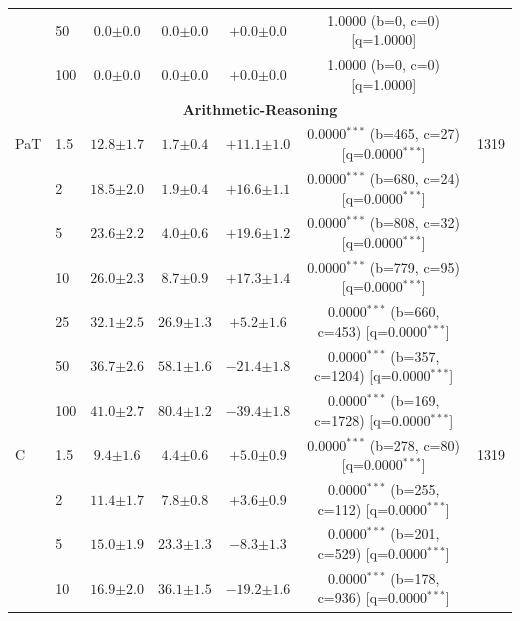 \begin{table}[h!]
\begin{tabular}{l l cccc c}
 & 50 & $0.0 {\scriptstyle \pm 0.0}$ & $0.0 {\scriptstyle \pm 0.0}$ & $+0.0 {\scriptstyle \pm 0.0}$ & 1.0000 (b=0, c=0) [q=1.0000] &  \\
 & 100 & $0.0 {\scriptstyle \pm 0.0}$ & $0.0 {\scriptstyle \pm 0.0}$ & $+0.0 {\scriptstyle \pm 0.0}$ & 1.0000 (b=0, c=0) [q=1.0000] &  \\
\midrule
\multicolumn{7}{c}{\textbf{Arithmetic-Reasoning}} \\
\midrule
PaT & 1.5 & $12.8 {\scriptstyle \pm 1.7}$ & $1.7 {\scriptstyle \pm 0.4}$ & $+11.1 {\scriptstyle \pm 1.0}$ & 0.0000$^{***}$ (b=465, c=27) [q=0.0000$^{***}$] & 1319 \\
 & 2 & $18.5 {\scriptstyle \pm 2.0}$ & $1.9 {\scriptstyle \pm 0.4}$ & $+16.6 {\scriptstyle \pm 1.1}$ & 0.0000$^{***}$ (b=680, c=24) [q=0.0000$^{***}$] &  \\
 & 5 & $23.6 {\scriptstyle \pm 2.2}$ & $4.0 {\scriptstyle \pm 0.6}$ & $+19.6 {\scriptstyle \pm 1.2}$ & 0.0000$^{***}$ (b=808, c=32) [q=0.0000$^{***}$] &  \\
 & 10 & $26.0 {\scriptstyle \pm 2.3}$ & $8.7 {\scriptstyle \pm 0.9}$ & $+17.3 {\scriptstyle \pm 1.4}$ & 0.0000$^{***}$ (b=779, c=95) [q=0.0000$^{***}$] &  \\
 & 25 & $32.1 {\scriptstyle \pm 2.5}$ & $26.9 {\scriptstyle \pm 1.3}$ & $+5.2 {\scriptstyle \pm 1.6}$ & 0.0000$^{***}$ (b=660, c=453) [q=0.0000$^{***}$] &  \\
 & 50 & $36.7 {\scriptstyle \pm 2.6}$ & $58.1 {\scriptstyle \pm 1.6}$ & $-21.4 {\scriptstyle \pm 1.8}$ & 0.0000$^{***}$ (b=357, c=1204) [q=0.0000$^{***}$] &  \\
 & 100 & $41.0 {\scriptstyle \pm 2.7}$ & $80.4 {\scriptstyle \pm 1.2}$ & $-39.4 {\scriptstyle \pm 1.8}$ & 0.0000$^{***}$ (b=169, c=1728) [q=0.0000$^{***}$] &  \\
\midrule
C & 1.5 & $9.4 {\scriptstyle \pm 1.6}$ & $4.4 {\scriptstyle \pm 0.6}$ & $+5.0 {\scriptstyle \pm 0.9}$ & 0.0000$^{***}$ (b=278, c=80) [q=0.0000$^{***}$] & 1319 \\
 & 2 & $11.4 {\scriptstyle \pm 1.7}$ & $7.8 {\scriptstyle \pm 0.8}$ & $+3.6 {\scriptstyle \pm 0.9}$ & 0.0000$^{***}$ (b=255, c=112) [q=0.0000$^{***}$] &  \\
 & 5 & $15.0 {\scriptstyle \pm 1.9}$ & $23.3 {\scriptstyle \pm 1.3}$ & $-8.3 {\scriptstyle \pm 1.3}$ & 0.0000$^{***}$ (b=201, c=529) [q=0.0000$^{***}$] &  \\
 & 10 & $16.9 {\scriptstyle \pm 2.0}$ & $36.1 {\scriptstyle \pm 1.5}$ & $-19.2 {\scriptstyle \pm 1.6}$ & 0.0000$^{***}$ (b=178, c=936) [q=0.0000$^{***}$] &  \\

\end{tabular}
\end{table}
